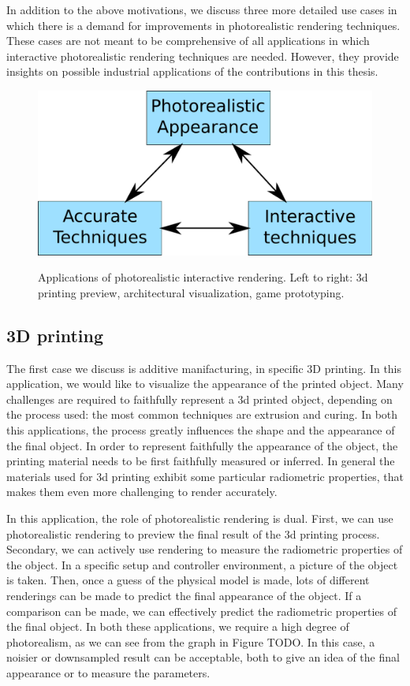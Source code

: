 In addition to the above motivations, we discuss three more detailed use cases in which there is a demand for improvements in photorealistic rendering techniques. These cases are not meant to be comprehensive of all applications in which interactive photorealistic rendering techniques are needed. However, they provide insights on possible industrial applications of the contributions in this thesis.

\begin{figure}
\centering
	 \includegraphics[draft,width=\textwidth]{figures/main_diagram}  \\
\caption{Applications of photorealistic interactive rendering. Left to right: 3d printing preview, architectural visualization, game prototyping.} 
\label{fig:applications}
\end{figure}

\subsection{3D printing}
The first case we discuss is additive manifacturing, in specific 3D printing. In this application, we would like to visualize the appearance of the printed object. Many challenges are required to faithfully represent a 3d printed object, depending on the process used: the most common techniques are extrusion and curing. In both this applications, the process greatly influences the shape and the appearance of the final object. In order to represent faithfully the appearance of the object, the printing material needs to be first faithfully measured or inferred. In general the materials used for 3d printing exhibit some particular radiometric properties, that makes them even more challenging to render accurately. 

In this application, the role of photorealistic rendering is dual. First, we can use photorealistic rendering to preview the final result of the 3d printing process. Secondary, we can actively use rendering to measure the radiometric properties of the object. In a specific setup and controller environment, a picture of the object is taken. Then, once a guess of the physical model is made, lots of different renderings can be made to predict the final appearance of the object. If a comparison can be made, we can effectively predict the radiometric properties of the final object. In both these applications, we require a high degree of photorealism, as we can see from the graph in Figure TODO. In this case, a noisier or downsampled result can be acceptable, both to give an idea of the final appearance or to measure the parameters. 

